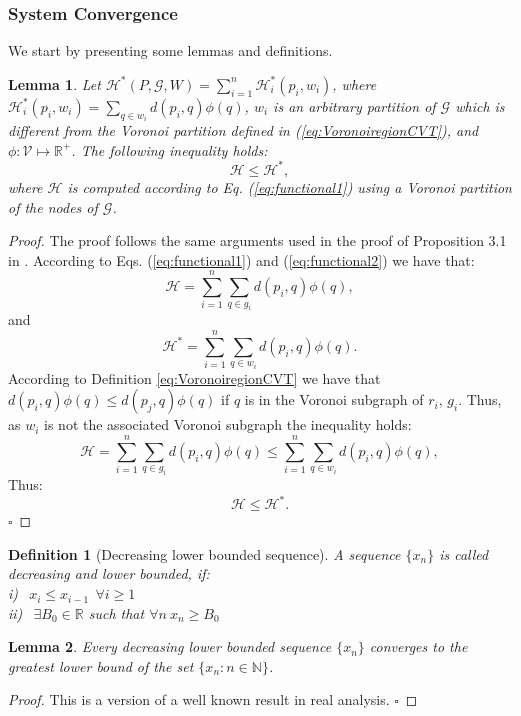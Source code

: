 \documentclass[smallcondensed]{svjour3}
\newtheorem{mylemma}{Lemma}
\newtheorem{mydef}{Definition}
\newcommand*{\QEDB}{\hfill\ensuremath{\square}}%
\begin{document}
\subsubsection{System Convergence}
%
We start by presenting some lemmas and  definitions.
%
\begin{mylemma}
\label{lema1}
Let 
%
$\mathcal{H}^*(P,\mathcal G,W) =
\sum_{i = 1}^{n} \mathcal{H}^*_{i}(p_i,w_i)$, where 
$\mathcal{H}_i^*(p_i,w_i) =
\sum_{q \in w_i} d(p_i,q) \phi(q)$,
$w_i$ is an arbitrary partition of $\mathcal G$ which is different from the Voronoi partition defined in (\ref{eq:VoronoiregionCVT}), and $\phi : \mathcal{V} \mapsto \mathbb R^+$. The following inequality holds:
\[\mathcal H \leq \mathcal H^*,\]
where $\mathcal H$ is computed according to Eq. (\ref{eq:functional1}) using a Voronoi partition of the nodes of $\mathcal{G}$.
\end{mylemma}
\begin{proof}
The proof follows the same arguments used in the proof of Proposition 3.1 in \citep{Qiang99}. According to Eqs. (\ref{eq:functional1}) and (\ref{eq:functional2}) we have that:
%
\[
\mathcal{H} =
\sum_{i = 1}^{n} \sum_{q \in g_i} d(p_i,q) \phi(q),
\]
and
\[
\mathcal{H}^* =
\sum_{i = 1}^{n} \sum_{q \in w_i} d(p_i,q) \phi(q).
\]
%
According to Definition \ref{eq:VoronoiregionCVT} we have that $d(p_i,q) \phi(q) \leq d(p_j,q) \phi(q)$ if $q$ is in the Voronoi subgraph of $r_i$, $g_i$. Thus, as $w_i$ is not the associated Voronoi subgraph the inequality holds:
%
\[
\mathcal{H} =
\sum_{i = 1}^{n} \sum_{q \in g_i} d(p_i,q) \phi(q) \leq 
\sum_{i = 1}^{n} \sum_{q \in w_i} d(p_i,q) \phi(q),
\]
%
Thus:
\[\mathcal{H}  \leq \mathcal{H}^*.
\]
\QEDB
\end{proof}
% 
%
\begin{mydef}[Decreasing lower bounded sequence]
\textnormal{A sequence $\{x_n\}$ is called decreasing and lower bounded, if:}\\
i) $~~x_i\leq x_{i-1}~~\forall i \geq 1$\\
ii) $~~\exists B_0 \in \mathbb{R}$ \textnormal{ such that } $\forall n ~x_n \geq B_0$\\
\end{mydef}
%
\begin{mylemma}
\label{lema2}
Every decreasing lower bounded sequence $\{x_n\}$ converges to the greatest lower bound of the set $\{x_n:n \in \mathbb N \}$. 
\end{mylemma}
%
\begin{proof}
This is a version of a well known result in real analysis. \QEDB
\end{proof}
\end{document}
